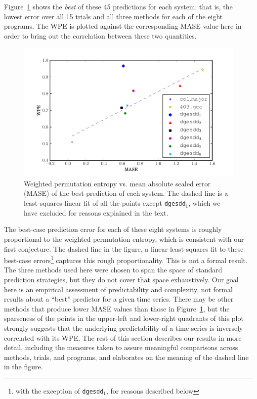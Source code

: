 Figure~\ref{fig:wpe_vs_mase_best} shows the {\sl best} of these 45
predictions for each system: that is, the lowest error over all 15
trials and all three methods for each of the eight programs.  The WPE
is plotted against the corresponding MASE value here in order to bring
out the correlation between these two quantities.
\begin{figure}[htbp]
  \centering
  \includegraphics[width=\columnwidth]{figs/prediction_vs_entropy}
  \caption{Weighted permutation entropy vs. mean absolute scaled error
    (MASE) of the best prediction of each system.
% 
% 
The dashed line is a least-squares linear fit of all the points except
{\tt dgesdd$_1$}, which we have excluded for reasons explained in the
text.}
  \label{fig:wpe_vs_mase_best}
\end{figure}
The best-case prediction error for each of these eight systems is
roughly proportional to the weighted permutation entropy, which is
consistent with our first conjecture.  The dashed line in the figure,
a linear least-squares fit to these best-case errors\footnote{with the
  exception of {\tt dgesdd$_1$}, for reasons described below} captures
this rough proportionality.  This is not a formal result.  The three
methods used here were chosen to span the space of standard prediction
strategies, but they do not cover that space exhaustively.  Our goal
here is an empirical assessment of predictability and complexity, not
formal results about a ``best'' predictor for a given time series.
There may be other methods that produce lower MASE values than those
in Figure~\ref{fig:wpe_vs_mase_best}, but the sparseness of the points
in the upper-left and lower-right quadrants of this plot strongly
suggests that the underlying predictability of a time series is
inversely correlated with its WPE.  The rest of this section describes
our results in more detail, including the measures taken to assure
meaningful comparisons across methods, trials, and programs, and
elaborates on the meaning of the dashed line in the figure.

